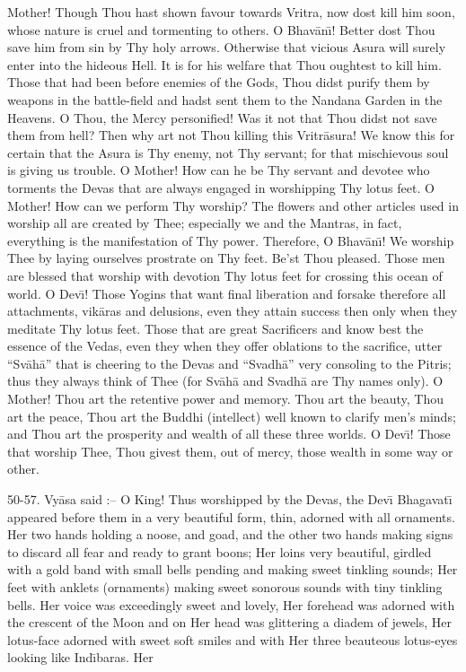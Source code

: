 Mother! Though Thou hast shown favour towards Vritra, now dost kill him soon, whose nature is cruel and tormenting to others. O Bhav\=an\={\i}! Better dost Thou save him from sin by Thy holy arrows. Otherwise that vicious Asura will surely enter into the hideous Hell. It is for his welfare that Thou oughtest to kill him. Those that had been before enemies of the Gods, Thou didst purify them by weapons in the battle-field and hadst sent them to the Nandana Garden in the Heavens. O Thou, the Mercy personified! Was it not that Thou didst not save them from hell? Then why art not Thou killing this Vritr\=asura! We know this for certain that the Asura is Thy enemy, not Thy servant; for that mischievous soul is giving us trouble. O Mother! How can he be Thy servant and devotee who torments the Devas that are always engaged in worshipping Thy lotus feet. O Mother! How can we perform Thy worship? The flowers and other articles used in worship all are created by Thee; especially we and the Mantras, in fact, everything is the manifestation of Thy power. Therefore, O Bhav\=an\={\i}! We worship Thee by laying ourselves prostrate on Thy feet. Be'st Thou pleased. Those men are blessed that worship with devotion Thy lotus feet for crossing this ocean of world. O Dev\={\i}! Those Yogins that want final liberation and forsake therefore all attachments, vik\=aras and delusions, even they attain success then only when they meditate Thy lotus feet. Those that are great Sacrificers and know best the essence of the Vedas, even they when they offer oblations to the sacrifice, utter ``Sv\=ah\=a'' that is cheering to the Devas and ``Svadh\=a'' very consoling to the Pitris; thus they always think of Thee (for Sv\=ah\=a and Svadh\=a are Thy names only). O Mother! Thou art the retentive power and memory. Thou art the beauty, Thou art the peace, Thou art the Buddhi (intellect) well known to clarify men's minds; and Thou art the prosperity and wealth of all these three worlds. O Dev\={\i}! Those that worship Thee, Thou givest them, out of mercy, those wealth in some way or other.

50-57. Vy\=asa said :-- O King! Thus worshipped by the Devas, the Dev\={\i} Bhagavat\={\i} appeared before them in a very beautiful form, thin, adorned with all ornaments. Her two hands holding a noose, and goad, and the other two hands making signs to discard all fear and ready to grant boons; Her loins very beautiful, girdled with a gold band with small bells pending and making sweet tinkling sounds; Her feet with anklets (ornaments) making sweet sonorous sounds with tiny tinkling bells. Her voice was exceedingly sweet and lovely, Her forehead was adorned with the crescent of the Moon and on Her head was glittering a diadem of jewels, Her lotus-face adorned with sweet soft smiles and with Her three beauteous lotus-eyes looking like Ind\={\i}baras. Her

